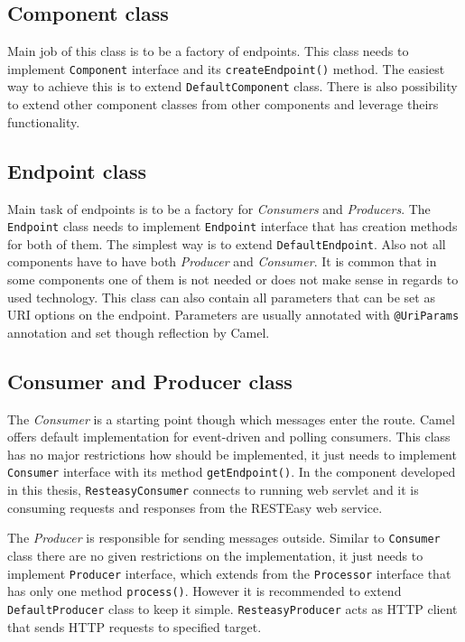 \documentclass[12pt,final,oneside]{fithesis2}
\begin{document}
\subsection*{Component class}
Main job of this class is to be a factory of endpoints. This class needs to implement \texttt{Component} interface and its \texttt{createEndpoint()} method. The easiest way to achieve this is to extend \texttt{DefaultComponent} class. There is also possibility to extend other component classes from other components and leverage theirs functionality.

\subsection*{Endpoint class}
Main task of endpoints is to be a factory for \textit{Consumers} and \textit{Producers}. The \texttt{Endpoint} class needs to implement \texttt{Endpoint} interface that has creation methods for both of them. The simplest way is to extend \texttt{DefaultEndpoint}. Also not all components have to have both \textit{Producer} and \textit{Consumer}. It is common that in some components one of them is not needed or does not make sense in regards to used technology. This class can also contain all parameters that can be set as URI options on the endpoint. Parameters are usually annotated with \texttt{@UriParams} annotation and set though reflection by Camel.

\subsection*{Consumer and Producer class}
The \textit{Consumer} is a starting point though which messages enter the route. Camel offers default implementation for event-driven and polling consumers. This class has no major restrictions how should be implemented, it just needs to implement \texttt{Consumer} interface with its method \texttt{getEndpoint()}. In the component developed in this thesis, \texttt{ResteasyConsumer} connects to running web servlet and it is consuming requests and responses from the RESTEasy web service. 

The \textit{Producer} is responsible for sending messages outside. Similar to \texttt{Consumer} class there are no given restrictions on the implementation, it just needs to implement \texttt{Producer} interface, which extends from the \texttt{Processor} interface that has only one method \texttt{process()}. However it is recommended to extend \texttt{DefaultProducer} class to keep it simple\cite{camel-cookbook}. \texttt{ResteasyProducer} acts as HTTP client that sends HTTP requests to specified target.
\end{document}
